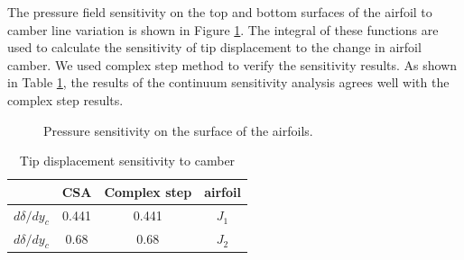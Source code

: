 \documentclass[12pt]{aiaa-pretty}
\begin{document}
The pressure field sensitivity on the top and bottom surfaces of the airfoil to camber line variation is shown in Figure \ref{fig:joukowskiChamberSensitivity}. The integral of these functions are used to calculate the sensitivity of tip displacement to the change in airfoil camber. We used complex step method to verify the sensitivity results. As shown in Table \ref{table:sensitivity}, the results of the continuum sensitivity analysis agrees well with the complex step results.

%
	\begin{figure}[H]
		\centering
		\quad
		\caption{Pressure sensitivity on the surface of the airfoils.}
		\label{fig:joukowskiChamberSensitivity}
	\end{figure}
%

%
\begin{table}[H]
\centering
\begin{tabular}{c|c|c|c}
 & \multicolumn{1}{c|}{CSA} & \multicolumn{1}{c|}{Complex step} & airfoil \\ \hline
$d\delta/dy_c$ & 0.441 & 0.441 & $J_1$ \\ \hline
$d\delta/dy_c$ & 0.68 & 0.68 & $J_2$ \\
\end{tabular}
\caption{Tip displacement sensitivity to camber}
\label{table:sensitivity}
\end{table}
%
\end{document}
